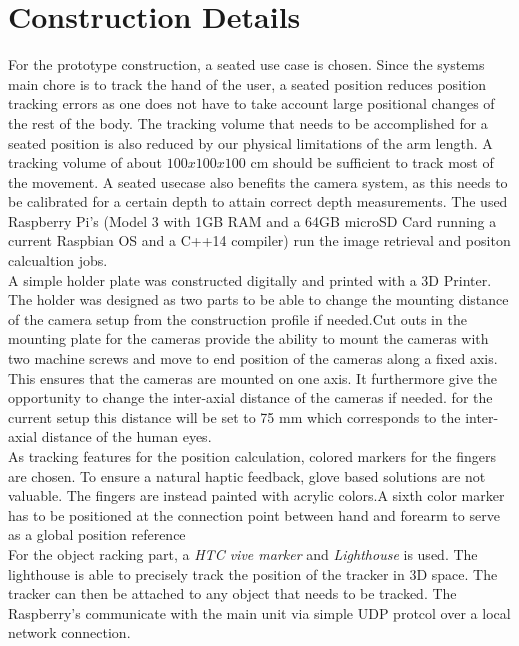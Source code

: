 \section{Construction Details}
For the prototype construction, a seated use case is chosen. Since the systems main chore is to track the hand of the user, a seated position reduces position tracking errors as one does not have to take account large positional changes of the rest of the body.
The tracking volume that needs to be accomplished for a seated position is also reduced by our physical limitations of the arm length. A tracking volume of about $100x100x100$ cm should be sufficient to track most of the movement. A seated usecase also benefits the camera system, as this needs to be calibrated for a certain depth to attain correct depth measurements.
The used Raspberry Pi's (Model 3 with 1GB RAM and a 64GB microSD Card running a current Raspbian OS and a C++14 compiler) run the image retrieval and positon calcualtion jobs.\\
A simple holder plate was constructed digitally and printed with a 3D Printer. The holder was designed as two parts to be able to change the mounting distance of the camera setup from the construction profile if needed.Cut outs in the mounting plate for the cameras provide the ability to mount the cameras with two machine screws and move to end position of the cameras along a fixed axis. This ensures that the cameras are mounted on one axis. It furthermore give the opportunity to change the inter-axial distance of the cameras if needed. for the current setup this distance will be set to 75 mm which corresponds to the inter-axial distance of the human eyes.\\As tracking features for the position calculation, colored markers for the fingers are chosen. To ensure a natural haptic feedback, glove based solutions are not valuable. The fingers are instead painted with acrylic colors.A sixth color marker has to be positioned at the connection point between hand and forearm to serve as a global position reference
\\For the object racking part, a \textit{HTC vive marker} and \textit{Lighthouse} is used. The lighthouse is able to precisely track the position of the tracker in 3D space. The tracker can then be attached to any object that needs to be tracked.
The Raspberry's communicate with the main unit via simple UDP protcol over a local network connection.
